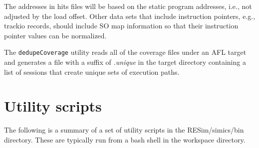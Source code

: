 \documentclass[titlepage]{article}
\begin{document}
The addresses in hits files will be based on the static program addresses, i.e., not adjusted
by the load offset.  Other data sets that include instruction pointers, e.g., trackio records, 
should include SO map information so that their instruction pointer values can be normalized.

The {\tt dedupeCoverage} utility reads all of the coverage files under an AFL target and generates
a file with a suffix of \textit{.unique} in the target directory containing a list of sessions that
create unique sets of execution paths.


\section{Utility scripts}
\label{utilities}
The following is a summary of a set of utility scripts in the RESim/simics/bin directory.
These are typically run from a bash shell in the workspace directory.  
\end{document}
